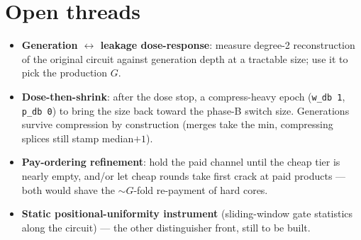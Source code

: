 \documentclass[11pt]{article}
\newcommand{\code}[1]{\texttt{#1}}
\begin{document}
\section{Open threads}
\begin{itemize}
\item \textbf{Generation $\leftrightarrow$ leakage dose-response}: measure
degree-2 reconstruction of the original circuit against generation depth at
a tractable size; use it to pick the production $G$.
\item \textbf{Dose-then-shrink}: after the dose stop, a compress-heavy
epoch (\code{w\_db 1}, \code{p\_db 0}) to bring the size back toward the
phase-B switch size. Generations survive compression by construction
(merges take the min, compressing splices still stamp median$+1$).
\item \textbf{Pay-ordering refinement}: hold the paid channel until the
cheap tier is nearly empty, and/or let cheap rounds take first crack at
paid products --- both would shave the $\sim G$-fold re-payment of hard
cores.
\item \textbf{Static positional-uniformity instrument} (sliding-window gate
statistics along the circuit) --- the other distinguisher front, still to
be built.
\end{itemize}
\end{document}
